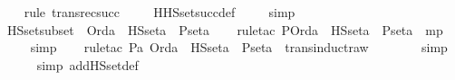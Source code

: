 \begin{isabellebody}
\ \ \ \isamarkupfalse%
{\isacharparenleft}{\kern0pt}rule\ transrec{}{\isacharunderscore}{\kern0pt}succ{\isacharparenright}{\kern0pt}\ \isanewline
\ \ \isamarkupfalse%
\ HHS{\isacharunderscore}{\kern0pt}set{\isacharunderscore}{\kern0pt}succ{\isacharunderscore}{\kern0pt}def\ \isanewline
\ \ \isamarkupfalse%
\ simp%
\endisatagproof
{\isafoldproof}%
%
\isadelimproof
\isanewline
%
\endisadelimproof
\isanewline
{}\isamarkupfalse%
\ HS{\isacharunderscore}{\kern0pt}set{\isacharunderscore}{\kern0pt}subset\ {\isacharcolon}{\kern0pt}\ {\isachardoublequoteopen}Ord{\isacharparenleft}{\kern0pt}a{\isacharparenright}{\kern0pt}\ {\isasymLongrightarrow}\ HS{\isacharunderscore}{\kern0pt}set{\isacharparenleft}{\kern0pt}a{\isacharparenright}{\kern0pt}\ {\isasymsubseteq}\ P{\isacharunderscore}{\kern0pt}set{\isacharparenleft}{\kern0pt}a{\isacharparenright}{\kern0pt}{\isachardoublequoteclose}\ \isanewline
%
\isadelimproof
\ \ %
\endisadelimproof
%
\isatagproof
{}\isamarkupfalse%
{\isacharparenleft}{\kern0pt}rule{\isacharunderscore}{\kern0pt}tac\ P{\isacharequal}{\kern0pt}{\isachardoublequoteopen}Ord{\isacharparenleft}{\kern0pt}a{\isacharparenright}{\kern0pt}\ {\isasymlongrightarrow}\ HS{\isacharunderscore}{\kern0pt}set{\isacharparenleft}{\kern0pt}a{\isacharparenright}{\kern0pt}\ {\isasymsubseteq}\ P{\isacharunderscore}{\kern0pt}set{\isacharparenleft}{\kern0pt}a{\isacharparenright}{\kern0pt}{\isachardoublequoteclose}\ \ mp{\isacharparenright}{\kern0pt}\ \isanewline
\ \ \ \isamarkupfalse%
\ simp\ \isanewline
\ \ \isamarkupfalse%
{\isacharparenleft}{\kern0pt}rule{\isacharunderscore}{\kern0pt}tac\ P{\isacharequal}{\kern0pt}{\isachardoublequoteopen}{\isasymlambda}a{\isachardot}{\kern0pt}\ Ord{\isacharparenleft}{\kern0pt}a{\isacharparenright}{\kern0pt}\ {\isasymlongrightarrow}\ HS{\isacharunderscore}{\kern0pt}set{\isacharparenleft}{\kern0pt}a{\isacharparenright}{\kern0pt}\ {\isasymsubseteq}\ P{\isacharunderscore}{\kern0pt}set{\isacharparenleft}{\kern0pt}a{\isacharparenright}{\kern0pt}{\isachardoublequoteclose}\ \ trans{\isacharunderscore}{\kern0pt}induct{}{\isacharunderscore}{\kern0pt}raw{\isacharparenright}{\kern0pt}\ \isanewline
\ \ \ \ \ \isamarkupfalse%
\ simp\ \isanewline
\ \ \ \ \isamarkupfalse%
\ {\isacharparenleft}{\kern0pt}simp\ add{\isacharcolon}{\kern0pt}HS{\isacharunderscore}{\kern0pt}set{\isacharunderscore}{\kern0pt}def{\isacharparenright}{\kern0pt}\ \isanewline

\end{isabellebody}
